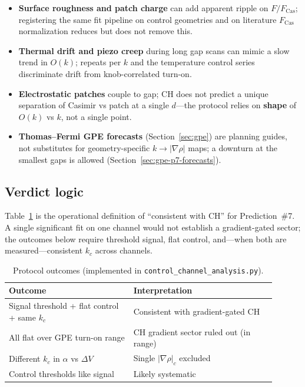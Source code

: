 \documentclass[11pt,a4paper]{article}
\begin{document}
\begin{itemize}[leftmargin=*]
  \item \textbf{Surface roughness and patch charge} can add apparent ripple on $F/F_{\mathrm{Cas}}$; registering the same fit pipeline on control geometries and on literature $F_{\mathrm{Cas}}$ normalization reduces but does not remove this.
  \item \textbf{Thermal drift and piezo creep} during long gap scans can mimic a slow trend in $O(k)$; repeats per $k$ and the temperature control series discriminate drift from knob-correlated turn-on.
  \item \textbf{Electrostatic patches} couple to gap; CH does not predict a unique separation of Casimir vs patch at a single $d$---the protocol relies on \textbf{shape} of $O(k)$ vs $k$, not a single point.
  \item \textbf{Thomas--Fermi GPE forecasts} (Section~\ref{sec:gpe}) are planning guides, not substitutes for geometry-specific $k \to |\nabla\rho|$ maps; a downturn at the smallest gaps is allowed (Section~\ref{sec:gpe-p7-forecasts}).
\end{itemize}

\subsection{Verdict logic}

Table~\ref{tab:verdict} is the operational definition of ``consistent with CH'' for Prediction~\#7.
A single significant fit on one channel would not establish a gradient-gated sector; the outcomes below require threshold signal, flat control, and---when both are measured---consistent $k_c$ across channels.

\begin{table}[htbp]
  \centering
  \caption{Protocol outcomes (implemented in \texttt{control\_channel\_analysis.py}).}
  \label{tab:verdict}
  \small
  \begin{tabular}{@{}p{0.42\linewidth}p{0.48\linewidth}@{}}
    \toprule
    Outcome & Interpretation \\
    \midrule
    Signal threshold + flat control + same $k_c$ & Consistent with gradient-gated CH \\
    All flat over GPE turn-on range & CH gradient sector ruled out (in range) \\
    Different $k_c$ in $\alpha$ vs $\Delta V$ & Single $|\nabla\rho|_c$ excluded \\
    Control thresholds like signal & Likely systematic \\
    \bottomrule
  \end{tabular}
\end{table}
\end{document}
